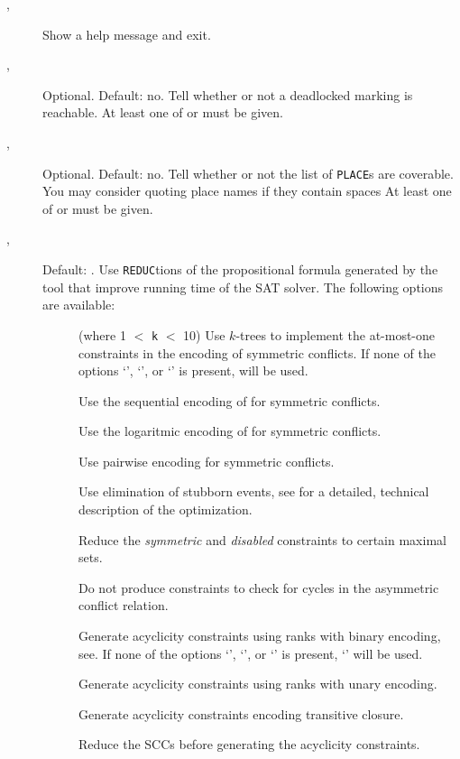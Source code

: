 \documentclass[a4paper]{refart}
\begin{document}
\begin{description}
\item[, ]
  Show a help message and exit.

\item[, ]
  Optional.  Default: no.
  Tell whether or not a deadlocked marking is reachable.
  At least one of  or  must be given.

\item[, ]
  Optional.  Default: no.
  Tell whether or not the list of \verb!PLACE!s are coverable.
  You may consider quoting place names if they contain spaces
  At least one of  or  must be given.

\item[, ]
  Default: .
  Use \verb!REDUC!tions of the propositional formula generated by the tool
  that improve running time of the SAT
  solver.  The following options are available:
  \begin{description}
  \item[]
    (where 1 $<$ \verb!k! $<$ 10)  Use $k$-trees to implement the
    at-most-one constraints in the encoding of symmetric conflicts.
    If none of the options `', `', or `' is
    present,  will be used.
  \item[]
    Use the sequential encoding of\cite{Sinz05} for symmetric conflicts.
  \item[]
    Use the logaritmic encoding of\cite{Frisch05} for symmetric conflicts.
  \item[]
    Use pairwise encoding for symmetric conflicts.
  \item[]
    Use elimination of stubborn events, see\cite{RS12rr} for a detailed,
    technical description of the optimization.
  \item[]
    Reduce the \emph{symmetric} and \emph{disabled} constraints to certain
    maximal sets.
  \item[]
    Do not produce constraints to check for cycles in the asymmetric
    conflict relation.
  \item[]
    Generate acyclicity constraints using ranks with binary encoding,
    see\cite{CGS09}. 
    If none of the options `', `', or `' is
    present, `' will be used.
  \item[]
    Generate acyclicity constraints using ranks with unary encoding.
  \item[]
    Generate acyclicity constraints encoding transitive closure.
  \item[]
    Reduce the SCCs before generating the acyclicity constraints.
  \end{description}


\end{description}
\end{document}

